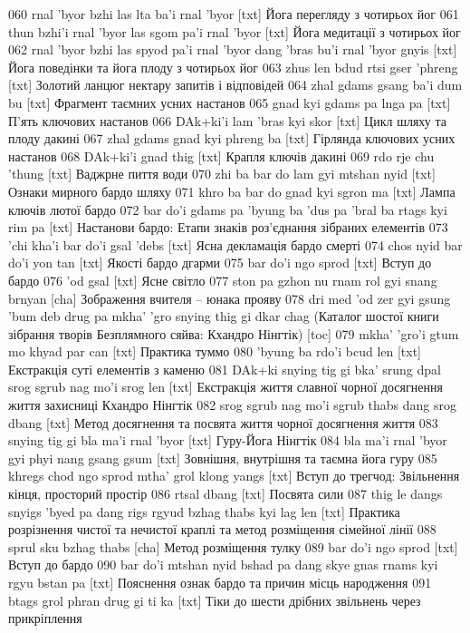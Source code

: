 \documentclass{article}
\begin{document}
060 rnal 'byor bzhi las lta ba'i rnal 'byor [txt] Йога перегляду з чотирьох йог
061 thun bzhi'i rnal 'byor las sgom pa'i rnal 'byor [txt] Йога медитації з чотирьох йог
062 rnal 'byor bzhi las spyod pa'i rnal 'byor dang 'bras bu'i rnal 'byor gnyis [txt] Йога поведінки та йога плоду з чотирьох йог
063 zhus len bdud rtsi gser 'phreng [txt] Золотий ланцюг нектару запитів і відповідей
064 zhal gdams gsang ba'i dum bu [txt] Фрагмент таємних усних настанов
065 gnad kyi gdams pa lnga pa [txt] П'ять ключових настанов
066 DAk+ki'i lam 'bras kyi skor [txt] Цикл шляху та плоду дакині
067 zhal gdams gnad kyi phreng ba [txt] Гірлянда ключових усних настанов
068 DAk+ki'i gnad thig [txt] Крапля ключів дакині
069 rdo rje chu 'thung [txt] Ваджрне пиття води
070 zhi ba bar do lam gyi mtshan nyid [txt] Ознаки мирного бардо шляху
071 khro ba bar do gnad kyi sgron ma [txt] Лампа ключів лютої бардо
072 bar do'i gdams pa 'byung ba 'dus pa 'bral ba rtags kyi rim pa [txt] Настанови бардо: Етапи знаків роз'єднання зібраних елементів
073 'chi kha'i bar do'i gsal 'debs [txt] Ясна декламація бардо смерті
074 chos nyid bar do'i yon tan [txt] Якості бардо дгарми
075 bar do'i ngo sprod [txt] Вступ до бардо
076 'od gsal [txt] Ясне світло
077 ston pa gzhon nu rnam rol gyi snang brnyan [cha] Зображення вчителя – юнака прояву
078 dri med 'od zer gyi gsung 'bum deb drug pa mkha' 'gro snying thig gi dkar chag (Каталог шостої книги зібрання творів Безплямного сяйва: Кхандро Нінгтік) [toc]
079 mkha' 'gro'i gtum mo khyad par can [txt] Практика туммо
080 'byung ba rdo'i bcud len [txt] Екстракція суті елементів з каменю
081 DAk+ki snying tig gi bka' srung dpal srog sgrub nag mo'i srog len [txt] Екстракція життя славної чорної досягнення життя захисниці Кхандро Нінгтік
082 srog sgrub nag mo'i sgrub thabs dang srog dbang [txt] Метод досягнення та посвята життя чорної досягнення життя
083 snying tig gi bla ma'i rnal 'byor [txt] Гуру-Йога Нінгтік
084 bla ma'i rnal 'byor gyi phyi nang gsang gsum [txt] Зовнішня, внутрішня та таємна йога гуру
085 khregs chod ngo sprod mtha' grol klong yangs [txt] Вступ до трегчод: Звільнення кінця, просторий простір
086 rtsal dbang [txt] Посвята сили
087 thig le dangs snyigs 'byed pa dang rigs rgyud bzhag thabs kyi lag len [txt] Практика розрізнення чистої та нечистої краплі та метод розміщення сімейної лінії
088 sprul sku bzhag thabs [cha] Метод розміщення тулку
089 bar do'i ngo sprod [txt] Вступ до бардо
090 bar do'i mtshan nyid bshad pa dang skye gnas rnams kyi rgyu bstan pa [txt] Пояснення ознак бардо та причин місць народження
091 btags grol phran drug gi ti ka [txt] Тіки до шести дрібних звільнень через прикріплення
\end{document}
